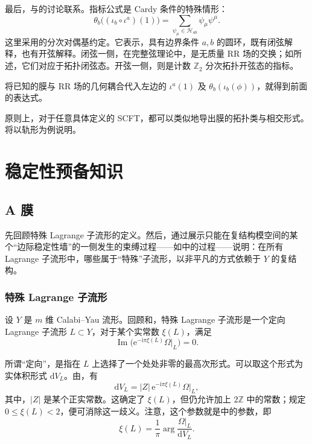 最后，与的讨论联系。指标公式是 Cardy 条件的特殊情形：
\[
\theta_b\bigl((\iota_b\circ\iota^a)(1)\bigr)
=\sum_{\psi_\mu\in\mathcal H_{ab}}\psi_\mu\psi^\mu.
\]
这里采用的分次对偶基约定。它表示，具有边界条件 $a,b$ 的圆环，既有闭弦解释，也有开弦解释。闭弦一侧，在完整弦理论中，是无质量 RR 场的交换；如所述，它们对应于拓扑闭弦态。开弦一侧，则是计数 $\mathbb{Z}_2$ 分次拓扑开弦态的指标。

将已知的膜与 RR 场的几何耦合代入左边的 $\iota^a(1)$ 及 $\theta_b(\iota_b(\phi))$，就得到前面的表达式。

原则上，对于任意具体定义的 SCFT，都可以类似地导出膜的拓扑类与相交形式。将以轨形为例说明。

\section{稳定性预备知识}\label{sec:5.2}

\subsection{A 膜}\label{sec:5.2.1}

先回顾特殊 Lagrange 子流形的定义。然后，通过展示只能在复结构模空间的某个“边际稳定性墙”的一侧发生的束缚过程——如中的过程——说明：在所有 Lagrange 子流形中，哪些属于“特殊”子流形，以非平凡的方式依赖于 $Y$ 的复结构。

\subsubsection{特殊 Lagrange 子流形}\label{sec:5.2.1.1}

设 $Y$ 是 $m$ 维 Calabi--Yau 流形。回顾和，特殊 Lagrange 子流形是一个定向 Lagrange 子流形 $L\subset Y$，对于某个实常数 $\xi(L)$，满足
\begin{equation}\label{eq:5.13}
\operatorname{Im}\bigl(\mathrm{e}^{-\mathrm{i}\pi\xi(L)}\Omega|_L\bigr)=0.
\end{equation}

所谓“定向”，是指在 $L$ 上选择了一个处处非零的最高次形式。可以取这个形式为实体积形式 $\mathrm{d}V_L$。由，有
\begin{equation}\label{eq:5.14}
\mathrm{d}V_L=|Z|\,\mathrm{e}^{-\mathrm{i}\pi\xi(L)}\Omega|_L,
\end{equation}
其中，$|Z|$ 是某个正实常数。这确定了 $\xi(L)$，但仍允许加上 $2\mathbb{Z}$ 中的常数；规定 $0\le\xi(L)<2$，便可消除这一歧义。注意，这个参数就是中的参数，即
\begin{equation}\label{eq:5.15}
\xi(L)=\frac{1}{\pi}\arg\frac{\Omega|_L}{\mathrm{d}V_L}.
\end{equation}

